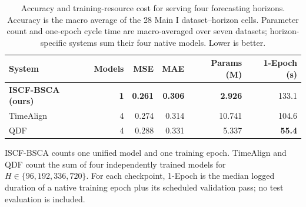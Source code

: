\begin{table}[t]
\centering
\caption{Accuracy and training-resource cost for serving four forecasting horizons. Accuracy is the macro average of the 28 Main I dataset--horizon cells. Parameter count and one-epoch cycle time are macro-averaged over seven datasets; horizon-specific systems sum their four native models. Lower is better.}
\label{tab:iscf-bsca-efficiency}
\small
\setlength{\tabcolsep}{6pt}
\begin{tabular}{lrrrrr}
\toprule
System & Models & MSE & MAE & Params (M) & 1-Epoch (s) \\
\midrule
\textbf{ISCF-BSCA (ours)} & \textbf{1} & \textbf{0.261} & \textbf{0.306} & \textbf{2.926} & 133.1 \\
TimeAlign & 4 & 0.274 & 0.314 & 10.741 & 104.6 \\
QDF & 4 & 0.288 & 0.331 & 5.337 & \textbf{55.4} \\
\bottomrule
\end{tabular}
\vspace{2pt}
\parbox{0.98\linewidth}{\footnotesize ISCF-BSCA counts one unified model and one training epoch. TimeAlign and QDF count the sum of four independently trained models for $H\in\{96,192,336,720\}$. For each checkpoint, 1-Epoch is the median logged duration of a native training epoch plus its scheduled validation pass; no test evaluation is included.}
\end{table}
